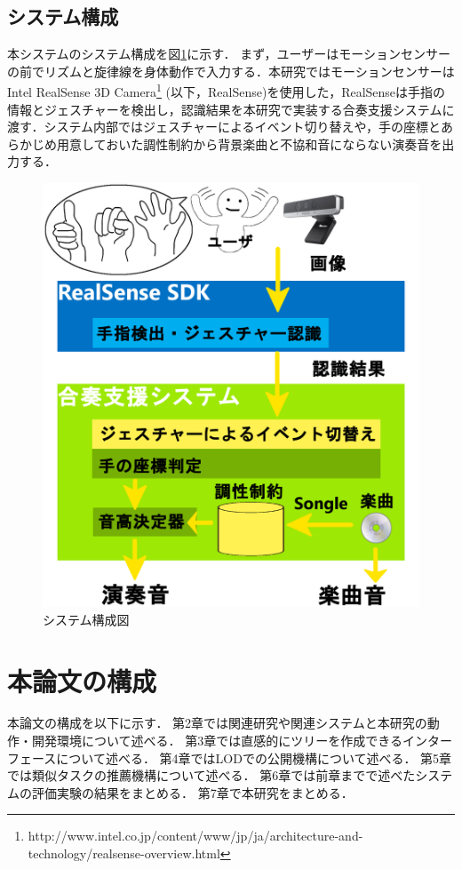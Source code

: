\subsection{システム構成}
本システムのシステム構成を図\ref{img:sys_const}に示す．
まず，ユーザーはモーションセンサーの前でリズムと旋律線を身体動作で入力する．本研究ではモーションセンサーはIntel RealSense 3D Camera\footnote{http://www.intel.co.jp/content/www/jp/ja/architecture-and-technology/realsense-overview.html} (以下，RealSense)を使用した，RealSenseは手指の情報とジェスチャーを検出し，認識結果を本研究で実装する合奏支援システムに渡す．システム内部ではジェスチャーによるイベント切り替えや，手の座標とあらかじめ用意しておいた調性制約から背景楽曲と不協和音にならない演奏音を出力する．
\begin{figure}[t]
	\begin{center}
		\includegraphics[width=0.9\linewidth]{assets/img/system_configuration_diagram.png}
		\caption{システム構成図}
		\label{img:sys_const}
	\end{center}
\end{figure}

\section{本論文の構成}
本論文の構成を以下に示す．
第2章では関連研究や関連システムと本研究の動作・開発環境について述べる．
第3章では直感的にツリーを作成できるインターフェースについて述べる．
第4章ではLODでの公開機構について述べる．
第5章では類似タスクの推薦機構について述べる．
第6章では前章までで述べたシステムの評価実験の結果をまとめる．
第7章で本研究をまとめる．
